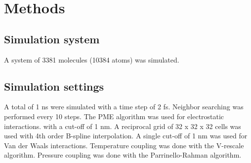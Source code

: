 \section{Methods}
\subsection{Simulation system}
A system of 3381 molecules (10384 atoms) was simulated.

\subsection{Simulation settings}
A total of 1 ns were simulated with a time step of 2 fs.
Neighbor searching was performed every 10 steps.
The PME algorithm was used for electrostatic interactions.
with a cut-off of 1 nm.
A reciprocal grid of 32 x 32 x 32 cells was used with 4th order B-spline interpolation.
A single cut-off of 1 nm was used for Van der Waals interactions.
Temperature coupling was done with the V-rescale algorithm.
Pressure coupling was done with the Parrinello-Rahman algorithm.
